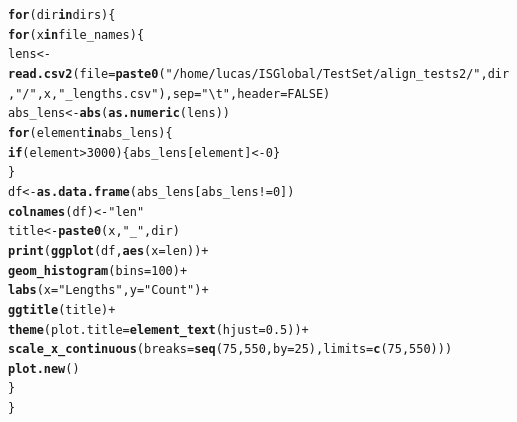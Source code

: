\documentclass[12pt, a4paper]{article}\usepackage[]{graphicx}\usepackage[]{color}
\makeatletter
\newcommand{\hlnum}[1]{\textcolor[rgb]{0.686,0.059,0.569}{#1}}%
\newcommand{\hlstr}[1]{\textcolor[rgb]{0.192,0.494,0.8}{#1}}%
\newcommand{\hlopt}[1]{\textcolor[rgb]{0,0,0}{#1}}%
\newcommand{\hlstd}[1]{\textcolor[rgb]{0.345,0.345,0.345}{#1}}%
\newcommand{\hlkwa}[1]{\textcolor[rgb]{0.161,0.373,0.58}{\textbf{#1}}}%
\newcommand{\hlkwb}[1]{\textcolor[rgb]{0.69,0.353,0.396}{#1}}%
\newcommand{\hlkwc}[1]{\textcolor[rgb]{0.333,0.667,0.333}{#1}}%
\newcommand{\hlkwd}[1]{\textcolor[rgb]{0.737,0.353,0.396}{\textbf{#1}}}%
\newenvironment{kframe}{%
 \def\at@end@of@kframe{}%
 \ifinner\ifhmode%
  \def\at@end@of@kframe{\end{minipage}}%
  \begin{minipage}{\columnwidth}%
 \fi\fi%
 \def\FrameCommand##1{\hskip\@totalleftmargin \hskip-\fboxsep
 \colorbox{shadecolor}{##1}\hskip-\fboxsep
     \hskip-\linewidth \hskip-\@totalleftmargin \hskip\columnwidth}%
 \MakeFramed {\advance\hsize-\width
   \@totalleftmargin\z@ \linewidth\hsize
   \@setminipage}}%
 {\par\unskip\endMakeFramed%
 \at@end@of@kframe}
\makeatother
\begin{document}
\begin{kframe}
\begin{alltt}
\hlkwa{for} \hlstd{(dir} \hlkwa{in} \hlstd{dirs)\{}
  \hlkwa{for} \hlstd{(x} \hlkwa{in} \hlstd{file_names)\{}
    \hlstd{lens} \hlkwb{<-} \hlkwd{read.csv2}\hlstd{(}\hlkwc{file} \hlstd{=} \hlkwd{paste0}\hlstd{(}\hlstr{"/home/lucas/ISGlobal/TestSet/align_tests2/"}\hlstd{,dir,}\hlstr{"/"}\hlstd{,x,}\hlstr{"_lengths.csv"}\hlstd{),} \hlkwc{sep} \hlstd{=} \hlstr{"\textbackslash{}t"}\hlstd{,} \hlkwc{header} \hlstd{=} \hlnum{FALSE}\hlstd{)}
    \hlstd{abs_lens} \hlkwb{<-} \hlkwd{abs}\hlstd{(}\hlkwd{as.numeric}\hlstd{(lens))}
    \hlkwa{for} \hlstd{(element} \hlkwa{in} \hlstd{abs_lens)\{}
      \hlkwa{if} \hlstd{(element} \hlopt{>} \hlnum{3000}\hlstd{)\{abs_lens[element]} \hlkwb{<-} \hlnum{0}\hlstd{\}}
    \hlstd{\}}
    \hlstd{df} \hlkwb{<-} \hlkwd{as.data.frame}\hlstd{(abs_lens[abs_lens} \hlopt{!=} \hlnum{0}\hlstd{])}
    \hlkwd{colnames}\hlstd{(df)} \hlkwb{<-} \hlstr{"len"}
    \hlstd{title} \hlkwb{<-} \hlkwd{paste0}\hlstd{(x,}\hlstr{"_"}\hlstd{,dir)}
    \hlkwd{print}\hlstd{(}\hlkwd{ggplot}\hlstd{(df,} \hlkwd{aes}\hlstd{(}\hlkwc{x} \hlstd{= len))} \hlopt{+}
        \hlkwd{geom_histogram}\hlstd{(}\hlkwc{bins} \hlstd{=} \hlnum{100}\hlstd{)} \hlopt{+}
        \hlkwd{labs}\hlstd{(}\hlkwc{x} \hlstd{=} \hlstr{"Lengths"}\hlstd{,} \hlkwc{y} \hlstd{=} \hlstr{"Count"}\hlstd{)} \hlopt{+}
        \hlkwd{ggtitle}\hlstd{(title)} \hlopt{+}
        \hlkwd{theme}\hlstd{(}\hlkwc{plot.title} \hlstd{=} \hlkwd{element_text}\hlstd{(}\hlkwc{hjust} \hlstd{=} \hlnum{0.5}\hlstd{))} \hlopt{+}
        \hlkwd{scale_x_continuous}\hlstd{(}\hlkwc{breaks} \hlstd{=} \hlkwd{seq}\hlstd{(}\hlnum{75}\hlstd{,} \hlnum{550}\hlstd{,} \hlkwc{by} \hlstd{=} \hlnum{25}\hlstd{),} \hlkwc{limits} \hlstd{=} \hlkwd{c}\hlstd{(}\hlnum{75}\hlstd{,}\hlnum{550}\hlstd{)))}
    \hlkwd{plot.new}\hlstd{()}
  \hlstd{\}}
\hlstd{\}}
\end{alltt}


{\ttfamily\noindent\color{warningcolor}{\#\# Warning: Removed 26 rows containing non-finite values (stat\_bin).}}

{\ttfamily\noindent\color{warningcolor}{\#\# Warning: Removed 1 rows containing missing values (geom\_bar).}}

{\ttfamily\noindent\color{warningcolor}{\#\# Warning: Removed 1242026 rows containing non-finite values (stat\_bin).}}

{\ttfamily\noindent\color{warningcolor}{\#\# Warning: Removed 1 rows containing missing values (geom\_bar).}}


\end{kframe}
\end{document}
